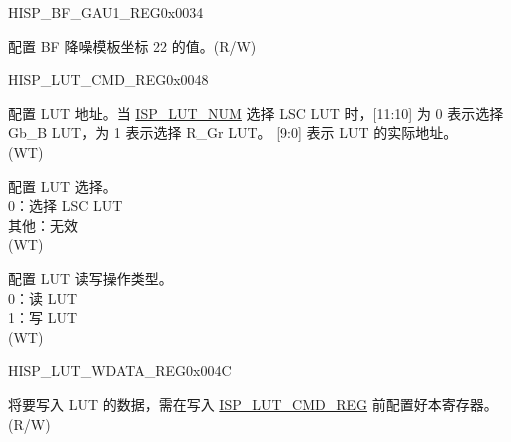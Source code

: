 \begin{register}{H}{ISP\_BF\_GAU1\_REG}{0x0034}\label{regdesc:ISPBFGAU1REG}
%
%
\regnewline%
\begin{regdesc}\begin{reglist}
\label{fielddesc:ISPGAUTEMPLATE22}\item [ISP\_GAU\_TEMPLATE22] 配置 BF 降噪模板坐标 22 的值。(R/W)
\end{reglist}\end{regdesc}
\end{register}


\begin{register}{H}{ISP\_LUT\_CMD\_REG}{0x0048}\label{regdesc:ISPLUTCMDREG}
%
%
%
%
\regnewline%
\begin{regdesc}\begin{reglist}
\label{fielddesc:ISPLUTADDR}\item [ISP\_LUT\_ADDR] 配置 LUT 地址。当 \hyperref[fielddesc:ISPLUTNUM]{ISP\_LUT\_NUM} 选择 LSC LUT 时，[11:10] 为 0 表示选择 Gb\_B LUT，为 1 表示选择 R\_Gr LUT。 [9:0] 表示 LUT 的实际地址。\\(WT)
\label{fielddesc:ISPLUTNUM}\item [ISP\_LUT\_NUM] 配置 LUT 选择。\\
0：选择 LSC LUT\\其他：无效\\(WT)
\label{fielddesc:ISPLUTCMD}\item [ISP\_LUT\_CMD] 配置 LUT 读写操作类型。\\0：读 LUT\\1：写 LUT\\(WT)
\end{reglist}\end{regdesc}
\end{register}


\begin{register}{H}{ISP\_LUT\_WDATA\_REG}{0x004C}\label{regdesc:ISPLUTWDATAREG}
%
\regnewline%
\begin{regdesc}\begin{reglist}
\label{fielddesc:ISPLUTWDATA}\item [ISP\_LUT\_WDATA] 将要写入 LUT 的数据，需在写入 \hyperref[regdesc:ISPLUTCMDREG]{ISP\_LUT\_CMD\_REG} 前配置好本寄存器。(R/W)
\end{reglist}\end{regdesc}
\end{register}


